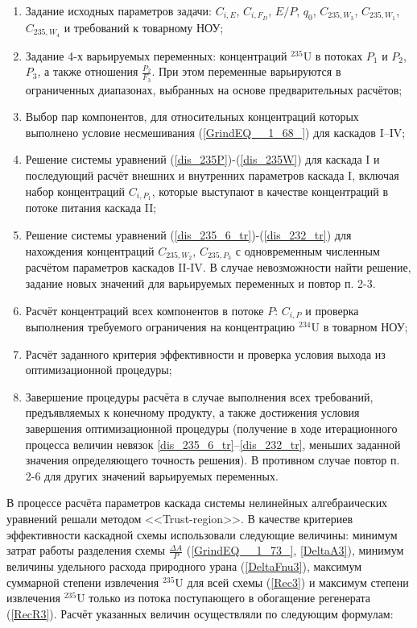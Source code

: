 \begin{enumerate}
    \item Задание исходных параметров задачи: $C_{i,E}$, $C_{i,F_D}$, $E/P$, $q_0$, $C_{235,{W_3}}$, $C_{235,{W_1}}$, $C_{235,{W_4}}$ и требований к товарному НОУ;
    \item Задание 4-х варьируемых переменных: концентраций $^{235}$U в потоках $P_1$ и $P_2$, $P_3$, а также отношения $\frac{P_{2}}{F_3}$. При этом переменные варьируются в ограниченных диапазонах, выбранных на основе предварительных расчётов; 
    \item Выбор пар компонентов, для относительных концентраций которых выполнено условие несмешивания (\ref{GrindEQ__1_68_}) для каскадов I--IV;
    \item Решение системы уравнений (\ref{dis_235P})-(\ref{dis_235W}) для каскада I и последующий расчёт внешних и внутренних параметров каскада I, включая набор концентраций $C_{i,{P_1}}$, которые выступают в качестве концентраций в потоке питания каскада II;
    \item Решение системы уравнений (\ref{dis_235_6_tr})-(\ref{dis_232_tr}) для нахождения концентраций $C_{235,{W_2}}$, $C_{235,{P_3}}$ с одновременным численным расчётом параметров каскадов II-IV. В случае невозможности найти решение, задание новых значений для варьируемых переменных и повтор п. 2-3.
    \item Расчёт концентраций всех компонентов в потоке $P$: $C_{i, P}$ и проверка выполнения требуемого ограничения на концентрацию $^{234}$U в товарном НОУ;
    \item Расчёт заданного критерия эффективности и проверка условия выхода из оптимизационной процедуры;
    \item Завершение процедуры расчёта в случае выполнения всех требований, предъявляемых к конечному продукту, а также достижения условия завершения оптимизационной процедуры (получение в ходе итерационного процесса величин невязок \ref{dis_235_6_tr}--\ref{dis_232_tr}, меньших заданной значения определяющего точность решения). В противном случае повтор п. 2-6 для других значений варьируемых переменных.
\end{enumerate}

В процессе расчёта параметров каскада системы нелинейных алгебраических уравнений решали методом <<Trust-region>>. В качестве критериев эффективности каскадной схемы использовали следующие величины: минимум затрат работы разделения схемы $\frac{\Delta A}{P}$ (\ref{GrindEQ__1_73_}, \ref{DeltaA3}), минимум величины удельного расхода природного урана (\ref{DeltaFnu3}), максимум суммарной степени извлечения $^{235}$U для всей схемы (\ref{Rec3}) и максимум степени извлечения $^{235}$U только из потока поступающего в обогащение регенерата (\ref{RecR3}). Расчёт указанных величин осуществляли по следующим формулам:

